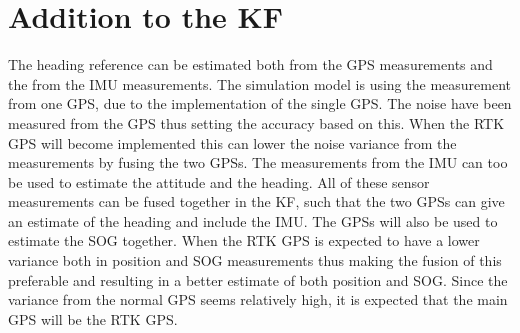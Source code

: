 \section{Addition to the \acl{KF}}
The heading reference can be estimated both from the \ac{GPS} measurements and the from the \ac{IMU} measurements. The simulation model is using the measurement from one \ac{GPS}, due to the implementation of the single \ac{GPS}. The noise have been measured from the \ac{GPS} thus setting the accuracy based on this. When the \ac{RTK} \ac{GPS} will become implemented this can lower the noise variance from the measurements by fusing the two \ac{GPS}s. The measurements from the \ac{IMU} can too be used to estimate the attitude and the heading. All of these sensor measurements can be fused together in the \ac{KF}, such that the two \ac{GPS}s can give an estimate of the heading and include the \ac{IMU}. The \ac{GPS}s will also be used to estimate the \ac{SOG} together. When the \ac{RTK} \ac{GPS} is expected to have a lower variance both in position and \ac{SOG} measurements thus making the fusion of this preferable and resulting in a better estimate of both position and \ac{SOG}. Since the variance from the normal \ac{GPS} seems relatively high, it is expected that the main \ac{GPS} will be the \ac{RTK} \ac{GPS}.



